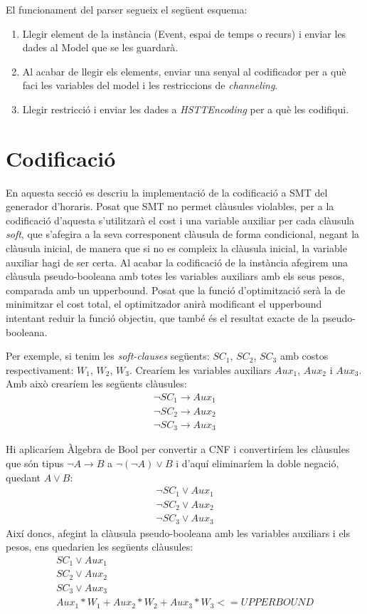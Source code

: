 \documentclass[11pt,a4paper,twoside]{report}
\begin{document}
  El funcionament del parser segueix el següent esquema:

  \begin{enumerate}
    \item Llegir element de la instància (Event, espai de temps o recurs) i enviar les dades al Model que se les guardarà.
    \item Al acabar de llegir els elements, enviar una senyal al codificador per a què faci les variables del model i les restriccions de \textit{channeling}.
    \item Llegir restricció i enviar les dades a \textit{HSTTEncoding} per a què les codifiqui.
  \end{enumerate}

  \section{Codificació}
  En aquesta secció es descriu la implementació de la codificació a SMT del generador d'horaris. 
  Posat que SMT no permet clàusules violables, per a la codificació d'aquesta s'utilitzarà el cost i una variable auxiliar per cada clàusula \textit{soft}, 
  que s'afegira a la seva corresponent clàusula de forma condicional, negant la clàusula inicial, de manera que si no es compleix la clàusula inicial, la variable auxiliar hagi de ser certa. Al acabar la codificació de la instància afegirem una clàusula pseudo-booleana amb totes les variables auxiliars amb els seus pesos, comparada amb un upperbound.
  Posat que la funció d'optimització serà la de minimitzar el cost total, el optimitzador anirà modificant el upperbound intentant reduir la funció objectiu, que també és el resultat exacte de la pseudo-booleana.

  Per exemple, si tenim les \textit{soft-clauses} següents: $SC_1$, $SC_2$, $SC_3$ amb costos respectivament: $W_1$, $W_2$, $W_3$. 
  Crearíem les variables auxiliars $Aux_1$, $Aux_2$ i $Aux_3$. Amb això crearíem les següents clàusules:
  \begin{gather*}
    \neg SC_1 \rightarrow Aux_1 \\
    \neg SC_2 \rightarrow Aux_2 \\
    \neg SC_3 \rightarrow Aux_3
  \end{gather*}

  Hi aplicaríem Àlgebra de Bool per convertir a CNF i convertiríem les clàusules que són tipus $\neg A \rightarrow B$ a $\neg (\neg A) \vee B$ i d'aquí eliminaríem la doble negació, quedant $A \vee B$:
  \begin{gather*}
    \neg SC_1 \vee Aux_1 \\
    \neg SC_2 \vee Aux_2 \\
    \neg SC_3 \vee Aux_3
  \end{gather*}
  Així doncs, afegint la clàusula pseudo-booleana amb les variables auxiliars i els pesos, ens quedarien les següents clàusules:
  \begin{gather*}
      SC_1 \vee Aux_1 \\
      SC_2 \vee Aux_2 \\
      SC_3 \vee Aux_3 \\
      Aux_1*W_1 + Aux_2*W_2 + Aux_3*W_3 <= UPPERBOUND
  \end{gather*}
\end{document}
